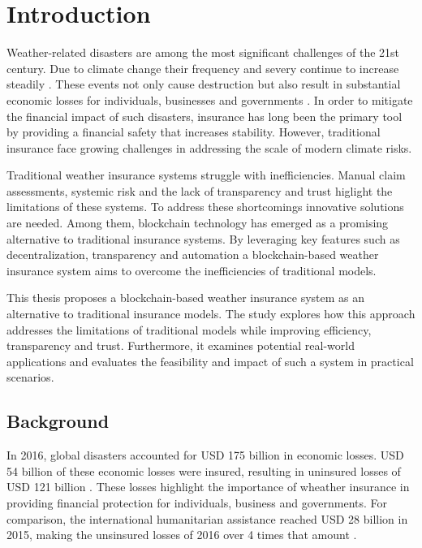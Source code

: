 \chapter{Introduction}\label{chapter:introduction} 

Weather-related disasters are among the most significant challenges of the 21st century. Due to climate change their frequency and severy continue to increase steadily \autocite{van2006impacts}. These events not only cause destruction but also result in substantial economic losses for individuals, businesses and governments \autocite{monasterolo2020climate}. In order to mitigate the financial impact of such disasters, insurance has long been the primary tool by providing a financial safety that increases stability. However, traditional insurance face growing challenges in addressing the scale of modern climate risks.

Traditional weather insurance systems struggle with inefficiencies. Manual claim assessments, systemic risk and the lack of transparency and trust higlight the limitations of these systems. To address these shortcomings innovative solutions are needed. Among them, blockchain technology has emerged as a promising alternative to traditional insurance systems. By leveraging key features such as decentralization, transparency and automation a blockchain-based weather insurance system aims to overcome the inefficiencies of traditional models. \autocite{Salem2021Developing} \autocite{Omar2023Blockchain-Based}

This thesis proposes a blockchain-based weather insurance system as an alternative to traditional insurance models. The study explores how this approach addresses the limitations of traditional models while improving efficiency, transparency and trust. Furthermore, it examines potential real-world applications and evaluates the feasibility and impact of such a system in practical scenarios.


\section{Background}\label{section:background}
In 2016, global disasters accounted for USD 175 billion in economic losses. USD 54 billion of these economic losses were insured, resulting in uninsured losses of USD 121 billion \autocite{swissre2017}. These losses highlight the importance of wheather insurance in providing financial protection for individuals, business and governments. For comparison, the international humanitarian assistance reached USD 28 billion in 2015, making the unsinsured losses of 2016 over 4 times that amount \autocite{development2016humanitarian}.

